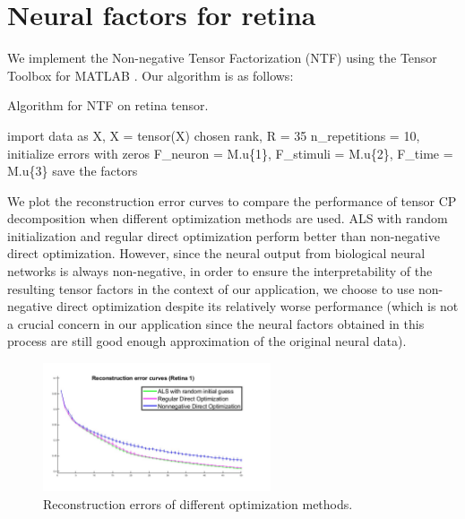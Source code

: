 \section{Neural factors for retina}
We implement the Non-negative Tensor Factorization (NTF) using the Tensor Toolbox for MATLAB \cite{tensortoolbox}. Our algorithm is as follows:

\setcounter{algocf}{1}
\begin{algorithm}[H]
\caption{Algorithm for NTF on retina tensor.}\label{alg:factors-retina}
\DontPrintSemicolon
import data as X, X = tensor(X) \;
chosen rank, R = 35 \;
n\_repetitions = 10, initialize errors with zeros \; 
F\_neuron = M.u\{1\}, F\_stimuli = M.u\{2\}, F\_time = M.u\{3\} \;
save the factors \;
\end{algorithm}

We plot the reconstruction error curves to compare the performance of tensor CP decomposition when different optimization methods are used. ALS with random initialization and regular direct optimization perform better than non-negative direct optimization. However, since the neural output from biological neural networks is always non-negative, in order to ensure the interpretability of the resulting tensor factors in the context of our application, we choose to use non-negative direct optimization despite its relatively worse performance (which is not a crucial concern in our application since the neural factors obtained in this process are still good enough approximation of the original neural data).

\begin{figure}[H]
\centering
    \includegraphics[width=0.6\textwidth]{figures/biological/retina1-reconstruction-error.jpg}
     \caption{Reconstruction errors of different optimization methods.}
\end{figure}  

